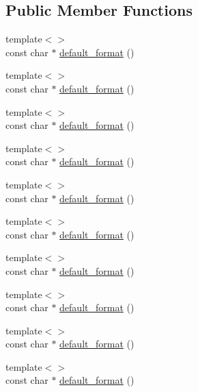 \subsection*{Public Member Functions}
\begin{DoxyCompactItemize}
\item 
{\footnotesize template$<$$>$ }\\const char $\ast$ \hyperlink{struct_d_d4hep_1_1_primitive_ab730bf542519e33e8401f3eac4a1403f}{default\+\_\+format} ()
\item 
{\footnotesize template$<$$>$ }\\const char $\ast$ \hyperlink{struct_d_d4hep_1_1_primitive_ae14f5e3c0bbfb2c5ac9cccd53b64d7e6}{default\+\_\+format} ()
\item 
{\footnotesize template$<$$>$ }\\const char $\ast$ \hyperlink{struct_d_d4hep_1_1_primitive_a9871b33130984b7d8816225c74230b23}{default\+\_\+format} ()
\item 
{\footnotesize template$<$$>$ }\\const char $\ast$ \hyperlink{struct_d_d4hep_1_1_primitive_aa575940300c3ff97164efc17e8b998fc}{default\+\_\+format} ()
\item 
{\footnotesize template$<$$>$ }\\const char $\ast$ \hyperlink{struct_d_d4hep_1_1_primitive_a37a3989db4b5acf5088bc980fef3cb16}{default\+\_\+format} ()
\item 
{\footnotesize template$<$$>$ }\\const char $\ast$ \hyperlink{struct_d_d4hep_1_1_primitive_a5a493c78bc830f69543606bed337cc3d}{default\+\_\+format} ()
\item 
{\footnotesize template$<$$>$ }\\const char $\ast$ \hyperlink{struct_d_d4hep_1_1_primitive_aaa233fa9267fbb95652212f23a4145ad}{default\+\_\+format} ()
\item 
{\footnotesize template$<$$>$ }\\const char $\ast$ \hyperlink{struct_d_d4hep_1_1_primitive_acf18ce3be7ed74fe60f2e9983d3eaaaf}{default\+\_\+format} ()
\item 
{\footnotesize template$<$$>$ }\\const char $\ast$ \hyperlink{struct_d_d4hep_1_1_primitive_a415aa3b8c09212b73f6d08fd879a6a7c}{default\+\_\+format} ()
\item 
{\footnotesize template$<$$>$ }\\const char $\ast$ \hyperlink{struct_d_d4hep_1_1_primitive_a0ec0e3359325f48afd85d62fe8377f88}{default\+\_\+format} ()

\end{DoxyCompactItemize}
